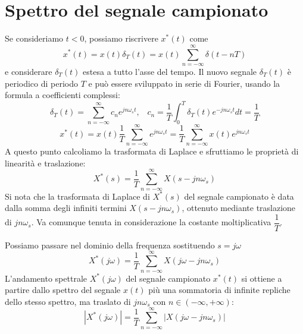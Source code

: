 \documentclass[a4paper]{report}
\begin{document}
\section{Spettro del segnale campionato}
Se consideriamo $t < 0$, possiamo riscrivere $x^{*}(t)$ come
\[
x^{*}(t) = x(t) \delta_T(t) = x(t) \sum_{n = -\infty}^{\infty} \delta
(t - nT)
\]
e considerare $\delta_T(t)$ estesa a tutto l'asse del tempo. Il nuovo
segnale $\delta_T(t)$ \`e periodico di periodo $T$ e pu\`o essere
sviluppato in serie di Fourier, usando la formula a coefficienti
complessi:
\[
\delta_T(t) = \sum_{n = -\infty}^{\infty} c_n e^{j n \omega_s t}, \;\;\;
c_n = \dfrac{1}{T} \int_{0}^{T} \delta_T(t) e^{-j n \omega_s t } dt =
\dfrac{1}{T} 
\]
\[
x^{*}(t) = x(t) \dfrac{1}{T} \sum_{n = -\infty}^{\infty} e^{j n
  \omega_s t} = \dfrac{1}{T} \sum_{n = -\infty}^{\infty} x(t) e^{j n
  \omega_s t} 
\]
A questo punto calcoliamo la trasformata di Laplace e sfruttiamo le
propriet\`a di linearit\`a e traslazione:
\begin{equation}
X^{*}(s) = \dfrac{1}{T} \sum_{n = - \infty}^{\infty} X(s - j n
\omega_s)
\end{equation}
Si nota che la trasformata di Laplace di $X^{*}(s)$ del segnale
campionato \`e data dalla somma degli infiniti termini $X(s - j n
\omega_s)$, ottenuto mediante traslazione di $j n \omega_s$. Va
comunque tenuta in considerazione la costante moltiplicativa
$\dfrac{1}{T}$. 

Possiamo passare nel dominio della frequenza sostituendo $s = j
\omega$
\begin{equation}
  X^{*}(j \omega) = \dfrac{1}{T} \sum_{n = - \infty}^{\infty} X(j\omega - j n
\omega_s)
\end{equation}
L'andamento spettrale $X^{*}(j \omega)$ del segnale campionato
$x^{*}(t)$ si ottiene a partire dallo spettro del segnale $x(t)$ pi\`u
una sommatoria di infinite repliche dello stesso spettro, ma traslato
di $j n \omega_s$ con $n \in (-\infty, +\infty)$:
\begin{equation}
  |X^{*}(j \omega)| = \dfrac{1}{T} \sum_{n = - \infty}^{\infty} |X(j\omega - j n
  \omega_s)|
\end{equation}
\end{document}
